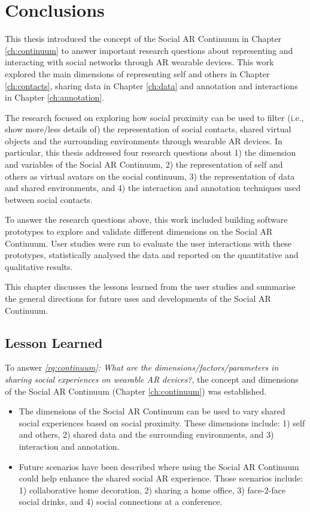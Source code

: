 \chapter{Conclusions}
\label{ch:conclusions}

This thesis introduced the concept of the Social AR Continuum in Chapter \ref{ch:continuum} to answer important research questions about representing and interacting with social networks through AR wearable devices. This work explored the main dimensions of representing self and others in Chapter \ref{ch:contacts}, sharing data in Chapter \ref{ch:data} and annotation and interactions in Chapter \ref{ch:annotation}. 

The research focused on exploring how social proximity can be used to filter (i.e., show more/less details of) the representation of social contacts, shared virtual objects and the surrounding environments through wearable AR devices. In particular, this thesis addressed four research questions about 1) the dimension and variables of the Social AR Continuum, 2) the representation of self and others as virtual avatars on the social continuum, 3) the representation of data and shared environments, and 4) the interaction and annotation techniques used between social contacts.   

To answer the research questions above, this work included building software prototypes to explore and validate different dimensions on the Social AR Continuum. User studies were run to evaluate the user interactions with these prototypes, statistically analysed the data and reported on the quantitative and qualitative results. 

This chapter discusses the lessons learned from the user studies and summarise the general directions for future uses and developments of the Social AR Continuum. 

\pagebreak

\section{Lesson Learned}
\noindent
To answer \textit{\ref{rq:continuum}: What are the dimensions/factors/parameters in sharing social experiences on wearable AR devices?}, the concept and dimensions of the Social AR Continuum (Chapter \ref{ch:continuum}) was established.

\begin{itemize}
    \item{The dimensions of the Social AR Continuum can be used to vary shared social experiences based on social proximity. These dimensions include: 1) self and others, 2) shared data and the surrounding environments, and 3) interaction and annotation.}
    \item{Future scenarios have been described where using the Social AR Continuum could help enhance the shared social AR experience. Those scenarios include: 1) collaborative home decoration, 2) sharing a home office, 3) face-2-face social drinks, and 4) social connections at a conference.}
\end{itemize}

